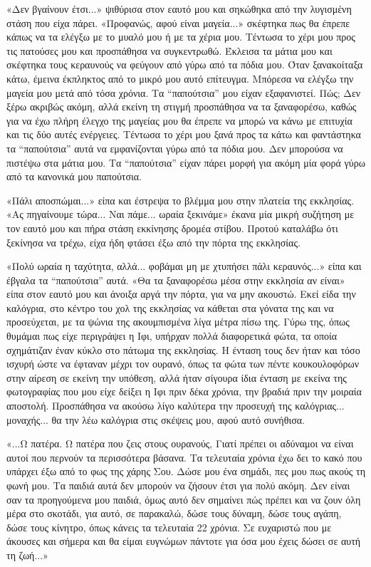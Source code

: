 \documentclass[12pt,twoside, openany]{book}
\begin{document}
«Δεν βγαίνουν έτσι...» ψιθύρισα στον εαυτό μου και σηκώθηκα από την λυγισμένη στάση που είχα πάρει. «Προφανώς, αφού είναι μαγεία...» σκέφτηκα πως θα έπρεπε κάπως να τα ελέγξω με το μυαλό μου ή με τα χέρια μου. Τέντωσα το χέρι μου προς τις πατούσες μου και προσπάθησα να συγκεντρωθώ. Έκλεισα τα μάτια μου και σκέφτηκα τους κεραυνούς να φεύγουν από γύρω από τα πόδια μου. Όταν ξανακοίταξα κάτω, έμεινα έκπληκτος από το μικρό μου αυτό επίτευγμα. Μπόρεσα να ελέγξω την μαγεία μου μετά από τόσα χρόνια. Τα “παπούτσια” μου είχαν εξαφανιστεί. Πώς; Δεν ξέρω ακριβώς ακόμη, αλλά εκείνη τη στιγμή προσπάθησα να τα ξαναφορέσω, καθώς για να έχω πλήρη έλεγχο της μαγείας μου θα έπρεπε να μπορώ να κάνω με επιτυχία και τις δύο αυτές ενέργειες. Τέντωσα το χέρι μου ξανά προς τα κάτω και φαντάστηκα τα “παπούτσια” αυτά να εμφανίζονται γύρω από τα πόδια μου. Δεν μπορούσα να πιστέψω στα μάτια μου. Τα “παπούτσια” είχαν πάρει μορφή για ακόμη μία φορά γύρω από τα κανονικά μου παπούτσια.

«Πάλι αποσπώμαι...» είπα και έστρεψα το βλέμμα μου στην πλατεία της εκκλησίας. «Ας πηγαίνουμε τώρα... Ναι πάμε... ωραία ξεκινάμε» έκανα μία μικρή συζήτηση με τον εαυτό μου και πήρα στάση εκκίνησης δρομέα στίβου. Προτού καταλάβω ότι ξεκίνησα να τρέχω, είχα ήδη φτάσει έξω από την πόρτα της εκκλησίας.

«Πολύ ωραία η ταχύτητα, αλλά... φοβάμαι μη με χτυπήσει πάλι κεραυνός...» είπα και έβγαλα τα “παπούτσια” αυτά. «Θα τα ξαναφορέσω μέσα στην εκκλησία αν είναι» είπα στον εαυτό μου και άνοιξα αργά την πόρτα, για να μην ακουστώ. Εκεί είδα την καλόγρια, στο κέντρο του χολ της εκκλησίας να κάθεται στα γόνατα της και να προσεύχεται, με τα ψώνια της ακουμπισμένα λίγα μέτρα πίσω της. Γύρω της, όπως θυμάμαι πως είχε περιγράψει η Ιφι, υπήρχαν πολλά διαφορετικά φώτα, τα οποία σχημάτιζαν έναν κύκλο στο πάτωμα της εκκλησίας. Η ένταση τους δεν ήταν και τόσο ισχυρή ώστε να έφταναν μέχρι τον ουρανό, όπως τα φώτα των πέντε κουκουλοφόρων στην αίρεση σε εκείνη την υπόθεση, αλλά ήταν σίγουρα ίδια ένταση με εκείνα της φωτογραφίας που μου είχε δείξει η Ιφι πριν δέκα χρόνια, την βραδιά πριν την μοιραία αποστολή. Προσπάθησα να ακούσω λίγο καλύτερα την προσευχή της καλόγριας... μοναχής... θα την λέω καλόγρια στις σκέψεις μου, αφού αυτό συνήθισα.

«...Ω πατέρα. Ω πατέρα που ζεις στους ουρανούς, Γιατί πρέπει οι αδύναμοι να είναι αυτοί που περνούν τα περισσότερα βάσανα. Τα τελευταία χρόνια έχω δει το κακό που υπάρχει έξω από το φως της χάρης Σου. Δώσε μου ένα σημάδι, πες μου πως ακούς τη φωνή μου. Τα παιδιά αυτά δεν μπορούν να ζήσουν έτσι για πολύ ακόμη. Δεν είναι σαν τα προηγούμενα μου παιδιά, όμως αυτό δεν σημαίνει πώς πρέπει και να ζουν όλη μέρα στο σκοτάδι, για αυτό, σε παρακαλώ, δώσε τους δύναμη, δώσε τους αγάπη, δώσε τους κίνητρο, όπως κάνεις τα τελευταία 22 χρόνια. Σε ευχαριστώ που με άκουσες και σήμερα και θα είμαι ευγνώμων πάντοτε για όσα μου έχεις δώσει σε αυτή τη ζωή...»
\end{document}

